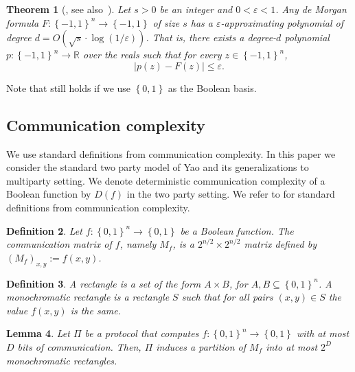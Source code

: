 \documentclass[10pt,a4paper]{article}
\newtheorem{theorem}{Theorem}
\newtheorem{definition}[theorem]{Definition}
\newtheorem{lemma}[theorem]{Lemma}
\let\citep\cite
\newcommand{\bool}{\left\{0,1\right\}}
\newcommand{\boolpm}{\left\{-1,1\right\}}
\newcommand{\real}{\mathbb{R}}
\newcommand{\prn}[1]{\left(#1\right)}
\begin{document}
    \begin{theorem}[\cite{Rei11b}, see also~\cite{ BNRdW07}]\label{thm:approx-polynomial}
		Let $s>0$ be an integer and $0<\varepsilon<1$. Any de Morgan formula $F\colon\boolpm^n\to\boolpm$ of size $s$ has a $\varepsilon$-approximating polynomial of degree $d=O(\sqrt{s}\cdot\log(1/\varepsilon))$. That is, there exists a degree-$d$ polynomial $p\colon\boolpm^n\to\real$ over the reals such that for every $z\in\boolpm^n$,
		\[
			\left| p(z)-F(z)\right| \leq \varepsilon.
		\]
	\end{theorem}
	
	Note that  still holds if we use $\bool$ as the Boolean basis.
    
	\subsection{Communication complexity}
	
	We use standard definitions from communication complexity. In this paper we consider the standard two party model of Yao and its generalizations to multiparty setting. We denote deterministic communication complexity of a Boolean function by $D(f)$ in the two party setting. We refer to \citep{Kushilevitz-Nisan97} for 
	standard definitions from communication complexity.
	
%
%
	    
%
%
	
%
	
	\begin{definition}
	    Let $f\colon\bool^{n}\to\bool$ be a Boolean function. The \emph{communication matrix of $f$}, namely $M_f$, is a $2^{n/2}\times2^{n/2}$ matrix defined by $\prn{M_f}_{x,y}:=f(x,y)$.
	\end{definition}
	
	\begin{definition}
	    A \emph{rectangle} is a set of the form $A\times B$, for $A,B\subseteq\bool^n$. A \emph{monochromatic rectangle} is a rectangle $S$ such that for all pairs $(x,y)\in S$ the value $f(x,y)$ is the same.
    \end{definition}
	
	\begin{lemma}
	    Let $\Pi$ be a protocol that computes $f\colon\bool^{n}\to\bool$ with at most $D$ bits of communication. Then, $\Pi$ induces a partition of $M_f$ into at most $2^D$ monochromatic rectangles.
	\end{lemma}
	
\end{document}
